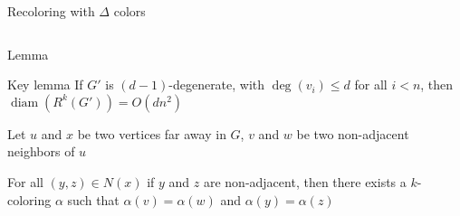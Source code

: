 \documentclass[11pt,xcolor=dvipsnames,presentation]{beamer}
\newcommand{\mycyan}{LightSeaGreen}
\DeclareMathOperator{\diam}{diam}
\begin{document}
\begin{frame}{Recoloring with $\Delta$ colors}
\begin{columns}
\begin{column}{.48\textwidth}
    \end{column}
  \end{columns}
          
\end{frame}

\begin{frame}{Lemma}
  \begin{block}{Key lemma}
    If $G'$ is $(d-1)$-degenerate, with $\deg(v_i) \le d$ for all $i <n$, then
    $\diam(R^k(G')) = O(dn^2)$  
  \end{block}

  Let $u$ and $x$ be two vertices far away in $G$, $v$ and $w$ be two
  non-adjacent neighbors of $u$
  
  For all $(y,z) \in N(x)$ if $y$ and $z$ are non-adjacent, then there exists a
  $k$-coloring $\alpha$ such that  $\alpha(v) = \alpha(w)$ and $\alpha(y) =
  \alpha(z)$
  \vspace{4cm}
\end{frame}
\end{document}
